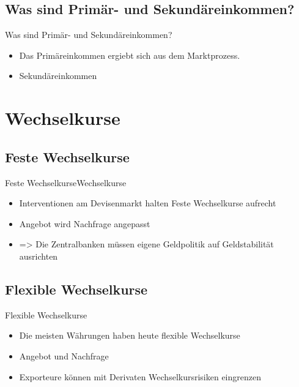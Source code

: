 \documentclass[10pt,a4paper, ngerman]{beamer}
\begin{document}
\subsection{Was sind Primär- und Sekundäreinkommen?}
\begin{frame}{Was sind Primär- und Sekundäreinkommen?}
\begin{itemize}
\item Das Primäreinkommen ergiebt sich aus dem Marktprozess. \pause
\item Sekundäreinkommen 
\end{itemize}
\end{frame}

\section{Wechselkurse}
\subsection{Feste Wechselkurse}
\begin{frame}{Feste Wechselkurse}{Wechselkurse}
\begin{itemize}
\item Interventionen am Devisenmarkt halten Feste Wechselkurse aufrecht \pause
\item Angebot wird Nachfrage angepasst \pause
\item => Die Zentralbanken müssen eigene Geldpolitik auf Geldstabilität ausrichten
\end{itemize}
\end{frame}

\subsection{Flexible Wechselkurse}
\begin{frame}{Flexible Wechselkurse}
\begin{itemize}
\item Die meisten Währungen haben heute flexible Wechselkurse \pause
\item Angebot und Nachfrage \pause
\item Exporteure können mit Derivaten Wechselkursrisiken eingrenzen
\end{itemize}
\end{frame}
\end{document}
